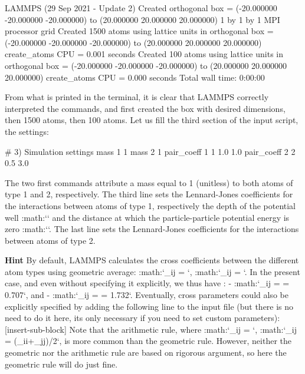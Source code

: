 \begin{lcverbatim}
LAMMPS (29 Sep 2021 - Update 2)
Created orthogonal box = (-20.000000 -20.000000 -20.000000) to (20.000000 20.000000 20.000000)
1 by 1 by 1 MPI processor grid
Created 1500 atoms
using lattice units in orthogonal box = (-20.000000 -20.000000 -20.000000) to (20.000000 20.000000 20.000000)
create_atoms CPU = 0.001 seconds
Created 100 atoms
using lattice units in orthogonal box = (-20.000000 -20.000000 -20.000000) to (20.000000 20.000000 20.000000)
create_atoms CPU = 0.000 seconds
Total wall time: 0:00:00
\end{lcverbatim}

From what is printed in the terminal, it is clear that
LAMMPS correctly interpreted the commands, and first created
the box with desired dimensions, then 1500 atoms, then 100
atoms.
Let us fill the third section of the input script, the settings:



\begin{lcverbatim}
# 3) Simulation settings
mass 1 1
mass 2 1
pair_coeff 1 1 1.0 1.0
pair_coeff 2 2 0.5 3.0
\end{lcverbatim}

The two first commands attribute a mass
equal to 1 (unitless) to both atoms of type 1 and 2,
respectively. The third line sets the Lennard-Jones
coefficients for the interactions between atoms of type 1,
respectively the depth of the potential well
:math:`\epsilon` and the distance at which the
particle-particle potential energy is zero :math:`\sigma`. 
The last line sets the Lennard-Jones coefficients for
the interactions between atoms of type 2.


\textbf{Hint} By default, LAMMPS calculates the cross coefficients between the different atom types
using geometric average: 
:math:`\epsilon_{ij} = `,
:math:`\sigma_{ij} = `. 
In the present case, and even without specifying it explicitly, we thus have :
- :math:`\epsilon_{ij} =  = 0.707`, and 
- :math:`\sigma_{ij} =  = 1.732`.
Eventually, cross parameters could also be explicitly specified by adding the following 
line to the input file (but there is no need to do it here, its only necessary if you need 
to set custom parameters):
[insert-sub-block]
Note that the arithmetic rule, where 
:math:`\epsilon_{ij} = `,
:math:`\sigma_{ij} = (\sigma_{ii}+\sigma_{jj})/2`, 
is more common than the geometric rule. However, neither the geometric nor the
arithmetic rule are based on rigorous argument, so here
the geometric rule will do just fine. 







